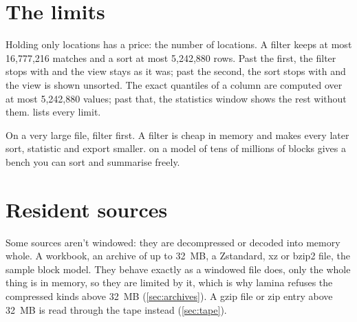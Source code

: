\section{The limits}\label{sec:huge-limits}

Holding only locations has a price: the number of locations. A filter keeps at most 16{,}777{,}216
matches and a sort at most 5{,}242{,}880 rows. Past the first, the filter stops with
 and the view stays as it was; past the second, the sort
stops with  and the view is shown unsorted. The exact quantiles of a column are computed over at most 5{,}242{,}880 values; past
that, the statistics window shows the rest without them.  lists every limit.

\begin{tip}
On a very large file, filter first. A filter is cheap in memory and makes every later sort, statistic
and export smaller.  on a model of tens of millions of blocks gives a bench
you can sort and summarise freely.
\end{tip}

\section{Resident sources}\label{sec:resident}

Some sources aren't windowed: they are decompressed or decoded into memory whole. A workbook, an archive
of up to 32~MB, a Zstandard, xz or bzip2 file, the sample block model. They behave exactly as a windowed
file does, only the whole thing is in memory, so they are limited by it, which is why lamina refuses the
compressed kinds above 32~MB (\cref{sec:archives}). A gzip file or zip entry above 32~MB is read through
the tape instead (\cref{sec:tape}).
